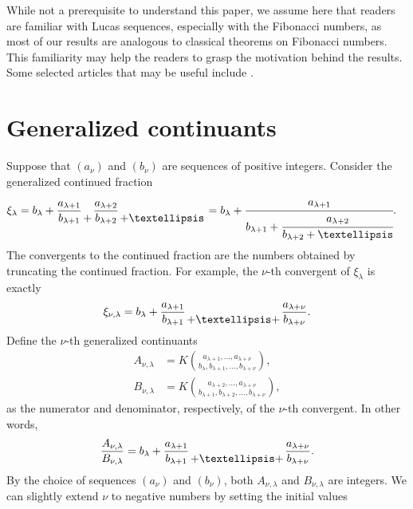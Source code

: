 \documentclass[12pt]{article}
\theoremstyle{plain}
\theoremstyle{definition}
\theoremstyle{remark}
\newcommand{\nobarfrac}{\genfrac{}{}{0pt}{}}
\begin{document}
While not a prerequisite to understand this paper, we assume here that readers are familiar with Lucas sequences, especially with the Fibonacci numbers, as most of our results are analogous to classical theorems on Fibonacci numbers. This familiarity may help the readers to grasp the motivation behind the results. Some selected articles that may be useful include \cite{Castellanos_86, Castellanos_89, Falcon_Plaza_09, Hoggatt_Bruggles_64, Ribenboim_04, Wall_60}.

\section{Generalized continuants} \label{Sec:Generalized_Continuants}

Suppose that $ (a_\nu) $ and $ (b_\nu) $ are sequences of positive integers. Consider the generalized continued fraction
\begin{align*}
	\xi_\lambda &= b_\lambda + \frac{a_{\lambda + 1}}{b_{\lambda + 1}} \nobarfrac{}{+} \frac{a_{\lambda + 2}}{b_{\lambda + 2}} \nobarfrac{}{+ \ldots} = b_\lambda + \cfrac{a_{\lambda + 1}}{b_{\lambda + 1} + \cfrac{a_{\lambda + 2}}{b_{\lambda + 2} + \ldots}}.
\end{align*}
The convergents to the continued fraction are the numbers obtained by truncating the continued fraction. For example, the $ \nu $-th convergent of $ \xi_\lambda $ is exactly  
\begin{align*}
	\xi_{\nu, \lambda} = b_\lambda + \frac{a_{\lambda + 1}}{b_{\lambda + 1}} \nobarfrac{}{+ \ldots +} \frac{a_{\lambda + \nu}}{b_{\lambda + \nu}}.
\end{align*}
Define the $ \nu $-th generalized continuants
\begin{align*}
	A_{\nu, \lambda} &= K \binom{a_{\lambda + 1}, \ldots, a_{\lambda + \nu}}{b_\lambda, b_{\lambda + 1}, \ldots, b_{\lambda + \nu}}, \\
	B_{\nu, \lambda} &= K \binom{a_{\lambda + 2}, \ldots, a_{\lambda + \nu}}{b_{\lambda + 1}, b_{\lambda + 2}, \ldots, b_{\lambda + \nu}},
\end{align*}
as the numerator and denominator, respectively, of the $ \nu $-th convergent. In other words,
\begin{align*}
	\frac{A_{\nu, \lambda}}{B_{\nu, \lambda}} = b_\lambda + \frac{a_{\lambda + 1}}{b_{\lambda + 1}} \nobarfrac{}{+ \ldots +} \frac{a_{\lambda + \nu}}{b_{\lambda + \nu}}.
\end{align*}
By the choice of sequences $ (a_\nu) $ and $ (b_\nu) $, both $ A_{\nu, \lambda} $ and $ B_{\nu, \lambda} $ are integers. We can slightly extend $ \nu $ to negative numbers by setting the initial values
\end{document}
